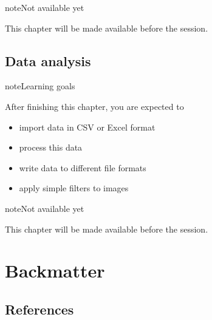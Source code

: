 \documentclass[letterpaper,10pt,english]{jupyterBook}
\begin{document}
\begin{sphinxadmonition}{note}{Not available yet}

\sphinxAtStartPar
This chapter will be made available before the session.
\end{sphinxadmonition}

\sphinxstepscope


\chapter{Data analysis}
\label{\detokenize{placeholder_notebooks/7_DataAnalysis/7_DataAnalysis_student:data-analysis}}\label{\detokenize{placeholder_notebooks/7_DataAnalysis/7_DataAnalysis_student::doc}}
\begin{sphinxadmonition}{note}{Learning goals}

\sphinxAtStartPar
After finishing this chapter, you are expected to
\begin{itemize}
\item {} 
\sphinxAtStartPar
import data in CSV or Excel format

\item {} 
\sphinxAtStartPar
process this data

\item {} 
\sphinxAtStartPar
write data to different file formats

\item {} 
\sphinxAtStartPar
apply simple filters to images

\end{itemize}
\end{sphinxadmonition}

\begin{sphinxadmonition}{note}{Not available yet}

\sphinxAtStartPar
This chapter will be made available before the session.
\end{sphinxadmonition}

\sphinxstepscope


\part{Backmatter}

\sphinxstepscope


\chapter{References}
\label{\detokenize{backmatter/references:references}}\label{\detokenize{backmatter/references::doc}}
\sphinxAtStartPar
{}
\end{document}
